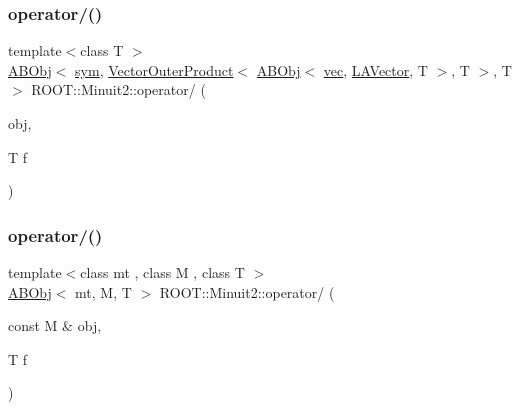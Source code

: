 \subsubsection{\texorpdfstring{operator/()}{operator/()}\hspace{0.1cm}{\footnotesize\ttfamily [2/3]}}
{\footnotesize\ttfamily template$<$class T $>$ \\
\mbox{\hyperlink{classROOT_1_1Minuit2_1_1ABObj}{A\+B\+Obj}}$<$ \mbox{\hyperlink{classROOT_1_1Minuit2_1_1sym}{sym}}, \mbox{\hyperlink{classROOT_1_1Minuit2_1_1VectorOuterProduct}{Vector\+Outer\+Product}}$<$ \mbox{\hyperlink{classROOT_1_1Minuit2_1_1ABObj}{A\+B\+Obj}}$<$ \mbox{\hyperlink{classROOT_1_1Minuit2_1_1vec}{vec}}, \mbox{\hyperlink{classROOT_1_1Minuit2_1_1LAVector}{L\+A\+Vector}}, T $>$, T $>$, T $>$ R\+O\+O\+T\+::\+Minuit2\+::operator/ (\begin{DoxyParamCaption}\item[{const \mbox{\hyperlink{classROOT_1_1Minuit2_1_1ABObj}{A\+B\+Obj}}$<$ \mbox{\hyperlink{classROOT_1_1Minuit2_1_1sym}{sym}}, \mbox{\hyperlink{classROOT_1_1Minuit2_1_1VectorOuterProduct}{Vector\+Outer\+Product}}$<$ \mbox{\hyperlink{classROOT_1_1Minuit2_1_1ABObj}{A\+B\+Obj}}$<$ \mbox{\hyperlink{classROOT_1_1Minuit2_1_1vec}{vec}}, \mbox{\hyperlink{classROOT_1_1Minuit2_1_1LAVector}{L\+A\+Vector}}, T $>$, T $>$, T $>$ \&}]{obj,  }\item[{T}]{f }\end{DoxyParamCaption})\hspace{0.3cm}{\ttfamily [inline]}}

\mbox{\label{namespaceROOT_1_1Minuit2_acfd7451cf386a28e70ea5be0965f631a}} 
\subsubsection{\texorpdfstring{operator/()}{operator/()}\hspace{0.1cm}{\footnotesize\ttfamily [3/3]}}
{\footnotesize\ttfamily template$<$class mt , class M , class T $>$ \\
\mbox{\hyperlink{classROOT_1_1Minuit2_1_1ABObj}{A\+B\+Obj}}$<$ mt, M, T $>$ R\+O\+O\+T\+::\+Minuit2\+::operator/ (\begin{DoxyParamCaption}\item[{const M \&}]{obj,  }\item[{T}]{f }\end{DoxyParamCaption})\hspace{0.3cm}{\ttfamily [inline]}}

